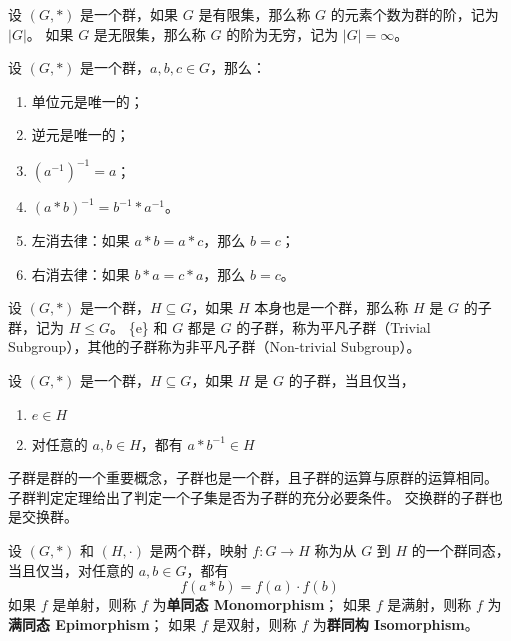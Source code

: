 \begin{definition}[群的阶]
    设 $(G, *)$ 是一个群，如果 $G$ 是有限集，那么称 $G$ 的元素个数为群的阶，记为 $|G|$。
    如果 $G$ 是无限集，那么称 $G$ 的阶为无穷，记为 $|G| = \infty$。
\end{definition}

\vspace{1em}

\begin{proposition}[群运算的性质]
    设 $(G, *)$ 是一个群，$a, b, c\in G$，那么：
    \begin{enumerate}
        \item 单位元是唯一的；
        \item 逆元是唯一的；
        \item $(a^{-1})^{-1} = a$；
        \item $(a * b)^{-1} = b^{-1} * a^{-1}$。
        \item 左消去律：如果 $a * b = a * c$，那么 $b = c$；
        \item 右消去律：如果 $b * a = c * a$，那么 $b = c$。
    \end{enumerate}
\end{proposition}
\vspace{1em}

\begin{definition}[子群 Subgroup]
    设 $(G, *)$ 是一个群，$H\subseteq G$，如果 $H$ 本身也是一个群，那么称 $H$ 是 $G$ 的子群，记为 $H \le G$。
    \{e\} 和 $G$ 都是 $G$ 的子群，称为平凡子群（Trivial Subgroup），其他的子群称为非平凡子群（Non-trivial Subgroup）。
\end{definition}

\begin{theorem}[子群判定定理]
    设 $(G, *)$ 是一个群，$H\subseteq G$，如果 $H$ 是 $G$ 的子群，当且仅当，
    \begin{enumerate}
        \item $e \in H$
        \item 对任意的 $a, b \in H$，都有 $a * b^{-1} \in H$
    \end{enumerate}
\end{theorem}
\begin{note}
    子群是群的一个重要概念，子群也是一个群，且子群的运算与原群的运算相同。
    子群判定定理给出了判定一个子集是否为子群的充分必要条件。
    交换群的子群也是交换群。
\end{note}
\vspace{1em}

\begin{definition}
    设 $(G, *)$ 和 $(H, \cdot)$ 是两个群，映射 $f: G \to H$ 称为从 $G$ 到 $H$ 的一个群同态，当且仅当，对任意的 $a, b\in G$，都有
    \[
        f(a * b) = f(a) \cdot f(b)
    \]
    如果 $f$ 是单射，则称 $f$ 为\textbf{单同态 Monomorphism}；
    如果 $f$ 是满射，则称 $f$ 为\textbf{满同态 Epimorphism}；
    如果 $f$ 是双射，则称 $f$ 为\textbf{群同构 Isomorphism}。
    \label{def:group_homomorphism}
\end{definition}

